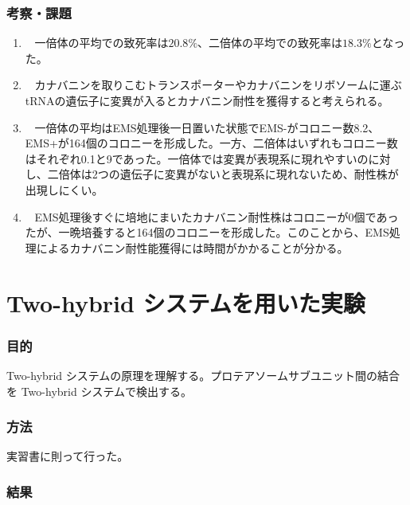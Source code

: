 \documentclass[a4paper,papersize,dvipdfmx]{jsarticle}
\newcommand{\mon}[1]{\item[({#1})] \ }
\begin{document}
\section*{考察・課題}
\begin{enumerate}
\mon{1} 一倍体の平均での致死率は$20.8\%$、二倍体の平均での致死率は$18.3\%$となった。
\mon{2} カナバニンを取りこむトランスポーターやカナバニンをリボソームに運ぶtRNAの遺伝子に変異が入るとカナバニン耐性を獲得すると考えられる。
\mon{3} 一倍体の平均はEMS処理後一日置いた状態でEMS-がコロニー数8.2、EMS+が164個のコロニーを形成した。一方、二倍体はいずれもコロニー数はそれぞれ0.1と9であった。一倍体では変異が表現系に現れやすいのに対し、二倍体は2つの遺伝子に変異がないと表現系に現れないため、耐性株が出現しにくい。
\mon{4} EMS処理後すぐに培地にまいたカナバニン耐性株はコロニーが0個であったが、一晩培養すると164個のコロニーを形成した。このことから、EMS処理によるカナバニン耐性能獲得には時間がかかることが分かる。
\end{enumerate}

\part*{Two-hybrid システムを用いた実験}

\section*{目的}
Two-hybrid システムの原理を理解する。プロテアソームサブユニット間の結合を Two-hybrid システムで検出する。

\section*{方法}
実習書に則って行った。

\section*{結果}
\end{document}
